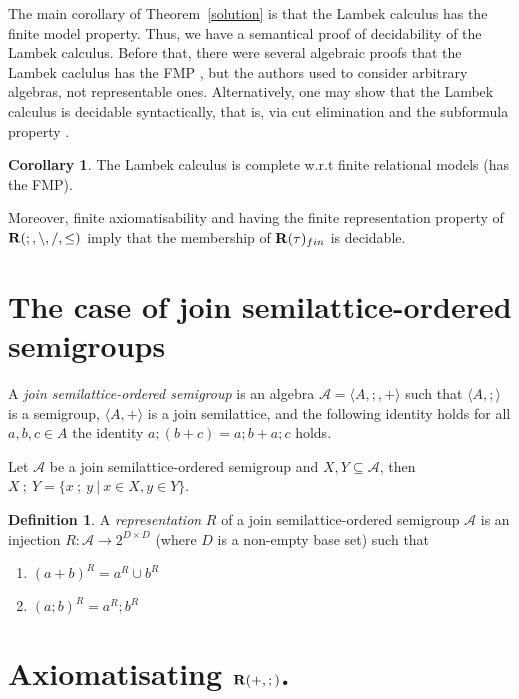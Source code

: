 \documentclass[a4paper]{article}
\theoremstyle{definition}
\newtheorem{definition}{Definition}
\theoremstyle{theorem}
\theoremstyle{proposition}
\theoremstyle{lemma}
\theoremstyle{ex}
\theoremstyle{corollary}
\newtheorem{corollary}{Corollary}
\theoremstyle{claim}
\begin{document}
The main corollary of Theorem~\ref{solution} is that the Lambek calculus has the finite model property. Thus, we have a semantical proof of decidability of the Lambek calculus. Before that, there were several algebraic proofs that the Lambek caclulus has the FMP \cite{buszkowski2008infinitary}, but the authors used to consider arbitrary algebras, not representable ones.
Alternatively, one may show that the Lambek calculus is decidable syntactically, that is, via cut elimination and the subformula property \cite{lambek1958mathematics}.

\begin{corollary} \label{fmp}
  The Lambek calculus is complete w.r.t finite relational models (has the FMP).
\end{corollary}

Moreover, finite axiomatisability and having the finite representation property of ${\bf R}(;, \setminus, /, \leq)$ imply that the membership of ${\bf R}(\tau)_{fin}$ is decidable.

\section{The case of join semilattice-ordered semigroups}

A \emph{join semilattice-ordered semigroup} is an algebra $\mathcal{A} = \langle A, ;, + \rangle$ such that $\langle A, ; \rangle$ is a semigroup, $\langle A, + \rangle$ is a join semilattice, and the following identity holds for all $a, b, c \in A$ the identity $a ; (b + c) = a ; b + a ; c$ holds.

Let $\mathcal{A}$ be a join semilattice-ordered semigroup and $X, Y \subseteq \mathcal{A}$, then $X \: ; \: Y = \{ x \: ; \: y \: | \: x \in X, y \in Y \}$.

\begin{definition}
  A \emph{representation} $R$ of a join semilattice-ordered semigroup $\mathcal{A}$
  is an injection $R : \mathcal{A} \to 2^{D \times D}$ (where $D$ is a non-empty base set) such that
  \begin{enumerate}
    \item $(a + b)^R = a^R \cup b^R$
    \item $(a ; b)^R = a^R ; b^R$
  \end{enumerate}
\end{definition}

\section{Axiomatisating ${\bf R}(+, ;)$.}
\end{document}
